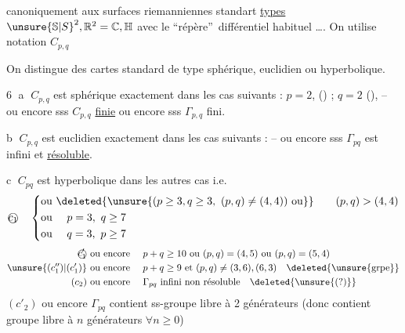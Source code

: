 canoniquement aux surfaces riemanniennes standart \uline{types} ${\unsure{\mathbb S|S}}^2,\mathbb R^2=\mathbb C,\mathbb H$ avec le \textquotedblleft répère\textquotedblright\ différentiel habituel \ldots. On utilise  notation $C_{p,q}$

 On distingue  des cartes standard de type sphérique, euclidien ou hyperbolique.

\textcircled{6} \textcircled{a}  $C_{p,q}$ est sphérique  exactement dans les cas suivants :  $p=2$, () ; $q=2$ (), 
-- ou encore sss $C_{p,q}$ \uline{finie} ou encore sss $\Gamma_{p,q}$ fini.

\textcircled{b} $C_{p,q}$ est euclidien exactement dans les cas suivants : 
 -- ou encore sss $\Gamma_{pq}$ est infini et \uline{résoluble}.

\textcircled{c} $C_{pq}$ est hyperbolique dans les autres cas i.e.   
\[
\text{\textcircled{$c_1$}}\quad
\left\{\begin{aligned}
&\text{ou }\deleted{\unsure{(p\geq3,q\geq3,\ (p,q)\ne(4,4))\ \text{ou}}}\qquad(p,q)>(4,4)\\
&\text{ou }\quad p=3,\ q\geq7\\
&\text{ou }\quad q=3,\ p\geq7
\end{aligned}\right.
\]
\[
\begin{aligned}
\text{\textcircled{$c'_1$}}\ &\text{ou encore }\quad p+q\geq10\ \text{ou }(p,q)=(4,5)\ \text{ou }(p,q)=(5,4)\\
\unsure{(c''_1)|(c'_1)}\ &\text{ou encore }\quad p+q\geq9\ \text{et }(p,q)\ne(3,6),(6,3)\quad\deleted{\unsure{\text{grpe}}}\\
(c_2)\ &\text{ou encore }\quad\Gamma_{pq}\ \text{infini non résoluble}\quad\deleted{\unsure{(?)}}
\end{aligned}
\]
$(c'_2)$ ou encore $\Gamma_{pq}$ contient ss-groupe libre à 2 générateurs (donc contient  groupe libre à $n$ générateurs $\forall n\geq0$)

